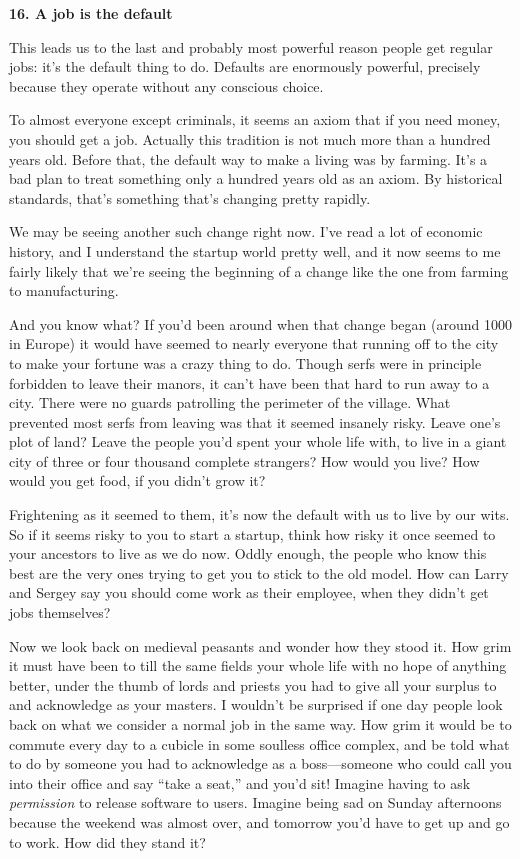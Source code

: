 \textbf{16. A job is the default}

This leads us to the last and probably most powerful reason people get
regular jobs: it's the default thing to do. Defaults are enormously
powerful, precisely because they operate without any conscious choice.

To almost everyone except criminals, it seems an axiom that if you need
money, you should get a job. Actually this tradition is not much more
than a hundred years old. Before that, the default way to make a living
was by farming. It's a bad plan to treat something only a hundred years
old as an axiom. By historical standards, that's something that's
changing pretty rapidly.

We may be seeing another such change right now. I've read a lot of
economic history, and I understand the startup world pretty well, and it
now seems to me fairly likely that we're seeing the beginning of a
change like the one from farming to manufacturing.

And you know what? If you'd been around when that change began (around
1000 in Europe) it would have seemed to nearly everyone that running off
to the city to make your fortune was a crazy thing to do. Though serfs
were in principle forbidden to leave their manors, it can't have been
that hard to run away to a city. There were no guards patrolling the
perimeter of the village. What prevented most serfs from leaving was
that it seemed insanely risky. Leave one's plot of land? Leave the
people you'd spent your whole life with, to live in a giant city of
three or four thousand complete strangers? How would you live? How would
you get food, if you didn't grow it?

Frightening as it seemed to them, it's now the default with us to live
by our wits. So if it seems risky to you to start a startup, think how
risky it once seemed to your ancestors to live as we do now. Oddly
enough, the people who know this best are the very ones trying to get
you to stick to the old model. How can Larry and Sergey say you should
come work as their employee, when they didn't get jobs themselves?

Now we look back on medieval peasants and wonder how they stood it. How
grim it must have been to till the same fields your whole life with no
hope of anything better, under the thumb of lords and priests you had to
give all your surplus to and acknowledge as your masters. I wouldn't be
surprised if one day people look back on what we consider a normal job
in the same way. How grim it would be to commute every day to a cubicle
in some soulless office complex, and be told what to do by someone you
had to acknowledge as a boss---someone who could call you into their
office and say ``take a seat,'' and you'd sit! Imagine having to ask
\emph{permission} to release software to users. Imagine being sad on
Sunday afternoons because the weekend was almost over, and tomorrow
you'd have to get up and go to work. How did they stand it?

